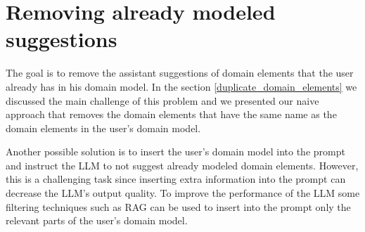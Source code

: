 \section{Removing already modeled suggestions}

The goal is to remove the assistant suggestions of domain elements that the user already has in his domain model. In the section \ref{duplicate_domain_elements} we discussed the main challenge of this problem and we presented our naive approach that removes the domain elements that have the same name as the domain elements in the user's domain model.

Another possible solution is to insert the user's domain model into the prompt and instruct the LLM to not suggest already modeled domain elements. However, this is a challenging task since inserting extra information into the prompt can decrease the LLM's output quality. To improve the performance of the LLM some filtering techniques such as RAG can be used to insert into the prompt only the relevant parts of the user's domain model.


%
%
%
%
%
%
%
%
%


